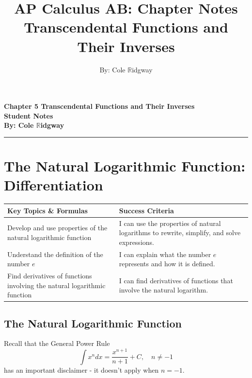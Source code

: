 \documentclass[12pt, letterpaper]{article}
\title{\textbf{AP Calculus AB: Chapter \mychapter{} Notes}\\ \large Transcendental Functions and Their Inverses}
\author{By: Cole $\mathbb{R}$idgway}
\date{}
\renewcommand{\maketitle}{
    \begin{center}
        \vspace{-2cm} %
        \LARGE \bfseries \textbf{Chapter 5 Transcendental Functions and Their Inverses} \\[1ex] 
        \large  Student Notes\\[1ex]
        \large By: Cole $\mathbb{R}$idgway \\[1ex]
        \vspace{0cm} %
    \end{center}
}
\begin{document}
\maketitle

\thispagestyle{empty}   %

\tableofcontents
\vspace{1em}
\hrule
\vspace{1em}

\newpage
\setcounter{page}{1}    %

\section{The Natural Logarithmic Function: Differentiation}

\begin{objectives}
    \renewcommand{\arraystretch}{1.5}
    \begin{tabularx}{\textwidth}{@{} >{\raggedright\arraybackslash}X >{\raggedright\arraybackslash}X @{}}
        \textbf{Key Topics \& Formulas} & \textbf{Success Criteria} \\ 
        \midrule[1.5pt]
        Develop and use properties of the natural logarithmic function & I can use the properties of natural logarithms to rewrite, simplify, and solve expressions. \\
        \midrule
        Understand the definition of the number $e$ & I can explain what the number $e$ represents and how it is defined. \\
        \midrule
        Find derivatives of functions involving the natural logarithmic function & I can find derivatives of functions that involve the natural logarithm. \\
    \end{tabularx}
\end{objectives}

\subsection{The Natural Logarithmic Function}

Recall that the General Power Rule 
$$\int x^n dx = \frac{x^{n+1}}{n+1}+C, \quad n \neq -1$$
has an important disclaimer - it doesn't apply when $n = -1$. \\
\end{document}
